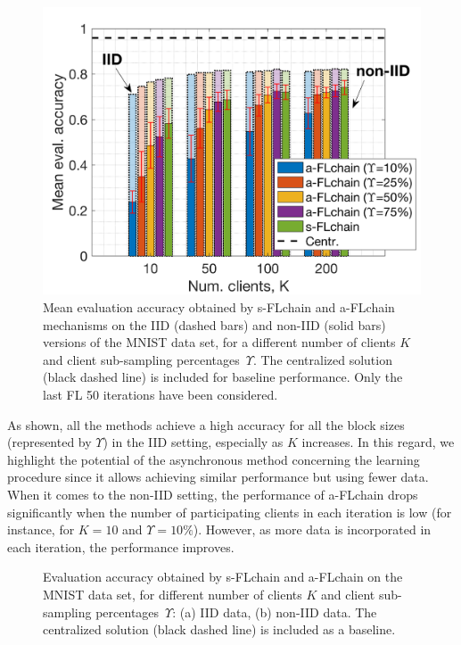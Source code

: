 \documentclass[10pt,journal,compsoc]{IEEEtran}
\begin{document}
\begin{figure}[ht!]
	\centering
	\includegraphics[width=0.75\columnwidth]{img/1_evaluation_accuracy.png}
	\caption{Mean evaluation accuracy obtained by s-FLchain and a-FLchain mechanisms on the IID (dashed bars) and non-IID (solid bars) versions of the MNIST data set, for a different number of clients $K$ and client sub-sampling percentages~$\Upsilon$. The centralized solution (black dashed line) is included for baseline performance. Only the last FL 50 iterations have been considered.}
	\label{fig:accuracy_loss_noniid}
\end{figure}

As shown, all the methods achieve a high accuracy for all the block sizes (represented by $\Upsilon$) in the IID setting, especially as $K$ increases. In this regard, we highlight the potential of the asynchronous method concerning the learning procedure since it allows achieving similar performance but using fewer data. When it comes to the non-IID setting, the performance of a-FLchain drops significantly when the number of participating clients in each iteration is low (for instance, for $K=10$ and $\Upsilon=10\%$). However, as more data is incorporated in each iteration, the performance improves.

\begin{figure}[ht!]
	\centering
	\caption{Evaluation accuracy obtained by s-FLchain and a-FLchain on the MNIST data set, for different number of clients $K$ and client sub-sampling percentages~$\Upsilon$: (a) IID data, (b) non-IID data. The centralized solution (black dashed line) is included as a baseline.}
	\label{fig:temporal_evolution}
\end{figure}
\end{document}
